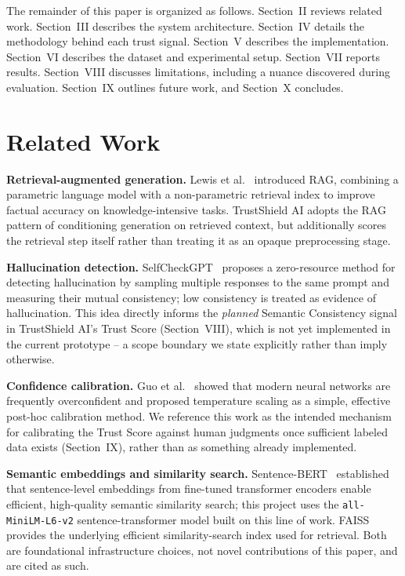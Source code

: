 \documentclass[conference]{IEEEtran}
\begin{document}
The remainder of this paper is organized as follows. Section~II reviews related work.
Section~III describes the system architecture. Section~IV details the methodology
behind each trust signal. Section~V describes the implementation. Section~VI describes
the dataset and experimental setup. Section~VII reports results. Section~VIII discusses
limitations, including a nuance discovered during evaluation. Section~IX outlines future
work, and Section~X concludes.

\section{Related Work}

\textbf{Retrieval-augmented generation.} Lewis et al.~\cite{lewis2020rag} introduced RAG,
combining a parametric language model with a non-parametric retrieval index to improve
factual accuracy on knowledge-intensive tasks. TrustShield AI adopts the RAG pattern of
conditioning generation on retrieved context, but additionally scores the retrieval step
itself rather than treating it as an opaque preprocessing stage.

\textbf{Hallucination detection.} SelfCheckGPT~\cite{selfcheckgpt} proposes a zero-resource
method for detecting hallucination by sampling multiple responses to the same prompt and
measuring their mutual consistency; low consistency is treated as evidence of
hallucination. This idea directly informs the \emph{planned} Semantic Consistency signal
in TrustShield AI's Trust Score (Section~VIII), which is not yet implemented in the
current prototype -- a scope boundary we state explicitly rather than imply otherwise.

\textbf{Confidence calibration.} Guo et al.~\cite{guo2017calibration} showed that modern
neural networks are frequently overconfident and proposed temperature scaling as a
simple, effective post-hoc calibration method. We reference this work as the intended
mechanism for calibrating the Trust Score against human judgments once sufficient
labeled data exists (Section~IX), rather than as something already implemented.

\textbf{Semantic embeddings and similarity search.} Sentence-BERT~\cite{reimers2019sbert}
established that sentence-level embeddings from fine-tuned transformer encoders enable
efficient, high-quality semantic similarity search; this project uses the
\texttt{all-MiniLM-L6-v2} sentence-transformer model built on this line of work.
FAISS~\cite{johnson2019faiss} provides the underlying efficient similarity-search
index used for retrieval. Both are foundational infrastructure choices, not novel
contributions of this paper, and are cited as such.
\end{document}
